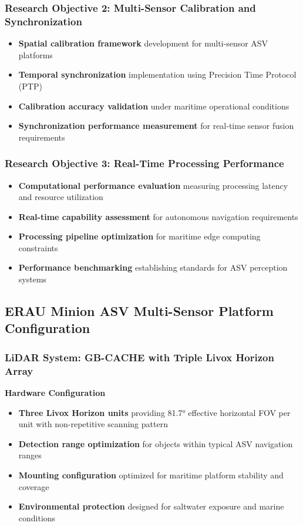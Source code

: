 \documentclass{erauthesis}
\begin{document}
\subsubsection{Research Objective 2: Multi-Sensor Calibration and Synchronization}
\begin{itemize}
\item \textbf{Spatial calibration framework} development for multi-sensor ASV platforms
\item \textbf{Temporal synchronization} implementation using Precision Time Protocol (PTP)
\item \textbf{Calibration accuracy validation} under maritime operational conditions
\item \textbf{Synchronization performance measurement} for real-time sensor fusion requirements
\end{itemize}

\subsubsection{Research Objective 3: Real-Time Processing Performance}
\begin{itemize}
\item \textbf{Computational performance evaluation} measuring processing latency and resource utilization
\item \textbf{Real-time capability assessment} for autonomous navigation requirements
\item \textbf{Processing pipeline optimization} for maritime edge computing constraints
\item \textbf{Performance benchmarking} establishing standards for ASV perception systems
\end{itemize}

\subsection{ERAU Minion ASV Multi-Sensor Platform Configuration}

\subsubsection{LiDAR System: GB-CACHE with Triple Livox Horizon Array}

\textbf{Hardware Configuration}
\begin{itemize}
\item \textbf{Three Livox Horizon units} providing 81.7° effective horizontal FOV per unit with non-repetitive scanning pattern
\item \textbf{Detection range optimization} for objects within typical ASV navigation ranges
\item \textbf{Mounting configuration} optimized for maritime platform stability and coverage
\item \textbf{Environmental protection} designed for saltwater exposure and marine conditions
\end{itemize}
\end{document}
